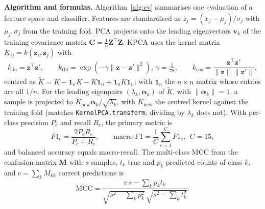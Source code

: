 \documentclass[runningheads]{llncs}
\begin{document}
\textbf{Algorithm and formulas.} Algorithm~\ref{alg:cv} summarises one evaluation of a feature space and classifier. Features are standardised as $z_j=(x_j-\mu_j)/\sigma_j$ with $\mu_j,\sigma_j$ from the training fold. PCA projects onto the leading eigenvectors $\mathbf{v}_k$ of the training covariance matrix $\mathbf{C}=\frac{1}{n}\mathbf{Z}^{\top}\mathbf{Z}$. KPCA uses the kernel matrix $K_{ij}=k(\mathbf{z}_i,\mathbf{z}_j)$ with
\begin{equation}
k_{\mathrm{lin}}=\mathbf{z}^{\top}\mathbf{z}',\qquad k_{\mathrm{rbf}}=\exp(-\gamma\lVert\mathbf{z}-\mathbf{z}'\rVert^{2}),\ \gamma=\tfrac{1}{78},\qquad k_{\cos}=\frac{\mathbf{z}^{\top}\mathbf{z}'}{\lVert\mathbf{z}\rVert\,\lVert\mathbf{z}'\rVert},
\end{equation}
centred as $\tilde{K}=K-\mathbf{1}_nK-K\mathbf{1}_n+\mathbf{1}_nK\mathbf{1}_n$; with $\mathbf{1}_n$ the $n\times n$ matrix whose entries are all $1/n$. For the leading eigenpairs $(\lambda_k,\boldsymbol{\alpha}_k)$ of $\tilde{K}$, with $\lVert\boldsymbol{\alpha}_k\rVert=1$, a sample is projected to $\tilde{K}_{\mathrm{new}}\boldsymbol{\alpha}_k/\sqrt{\lambda_k}$, with $\tilde{K}_{\mathrm{new}}$ the centred kernel against the training fold (matches \texttt{KernelPCA.transform}; dividing by $\lambda_k$ does not). With per-class precision $P_c$ and recall $R_c$, the primary metric is
\begin{equation}
F1_c=\frac{2P_cR_c}{P_c+R_c},\qquad \text{macro-F1}=\frac{1}{C}\sum_{c=1}^{C}F1_c,\ \ C=15,
\end{equation}
and balanced accuracy equals macro-recall. The multi-class MCC from the confusion matrix $\mathbf{M}$ with $s$ samples, $t_k$ true and $p_k$ predicted counts of class $k$, and $c=\sum_k M_{kk}$ correct predictions is
\begin{equation}
\mathrm{MCC}=\frac{c\,s-\sum_k p_kt_k}{\sqrt{s^{2}-\sum_k p_k^{2}}\,\sqrt{s^{2}-\sum_k t_k^{2}}}.
\end{equation}
\end{document}
